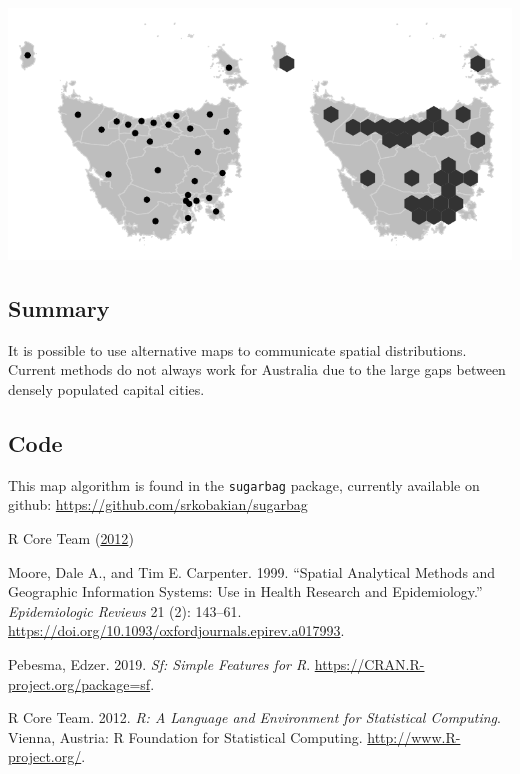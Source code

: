 \begin{Schunk}

\includegraphics{algorithmRjournal_files/figure-latex/plot_final-1} \end{Schunk}

\hypertarget{summary}{%
\subsection{Summary}\label{summary}}

It is possible to use alternative maps to communicate spatial
distributions. Current methods do not always work for Australia due to
the large gaps between densely populated capital cities.

\hypertarget{code}{%
\subsection{Code}\label{code}}

This map algorithm is found in the \texttt{sugarbag} package, currently
available on github: \url{https://github.com/srkobakian/sugarbag}

R Core Team (\protect\hyperlink{ref-R}{2012})



\hypertarget{refs}{}
\leavevmode\hypertarget{ref-SAMGIS}{}%
Moore, Dale A., and Tim E. Carpenter. 1999. ``Spatial Analytical Methods
and Geographic Information Systems: Use in Health Research and
Epidemiology.'' \emph{Epidemiologic Reviews} 21 (2): 143--61.
\url{https://doi.org/10.1093/oxfordjournals.epirev.a017993}.

\leavevmode\hypertarget{ref-sf}{}%
Pebesma, Edzer. 2019. \emph{Sf: Simple Features for R}.
\url{https://CRAN.R-project.org/package=sf}.

\leavevmode\hypertarget{ref-R}{}%
R Core Team. 2012. \emph{R: A Language and Environment for Statistical
Computing}. Vienna, Austria: R Foundation for Statistical Computing.
\url{http://www.R-project.org/}.

